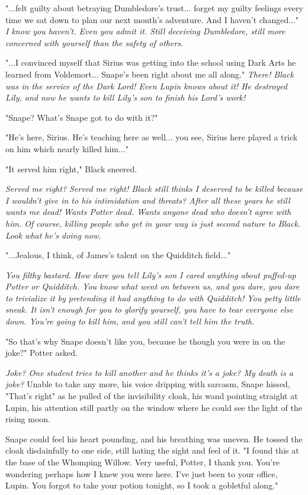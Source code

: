 \documentclass[a4paper,11pt]{article}
\begin{document}
"...felt guilty about betraying Dumbledore's trust... forget my guilty feelings every time we sat down to plan our next month's adventure. And I haven't changed..." \emph{I know you haven't. Even you admit it. Still deceiving Dumbledore, still more concerned with yourself than the safety of others.}

"...I convinced myself that Sirius was getting into the school using Dark Arts he learned from Voldemort... Snape's been right about me all along." \emph{There! Black was in the service of the Dark Lord! Even Lupin knows about it! He destroyed Lily, and now he wants to kill Lily's son to finish his Lord's work!}

"Snape? What's Snape got to do with it?"

"He's here, Sirius. He's teaching here as well... you see, Sirius here played a trick on him which nearly killed him..."

"It served him right," Black sneered.

\emph{Served me right? Served me right! Black still thinks I deserved to be killed because I wouldn't give in to his intimidation and threats? After all these years he still wants me dead! Wants Potter dead. Wants anyone dead who doesn't agree with him. Of course, killing people who get in your way is just second nature to Black. Look what he's doing now.}

"...Jealous, I think, of James's talent on the Quidditch field..."

\emph{You filthy bastard. How dare you tell Lily's son I cared anything about puffed-up Potter or Quidditch. You know what went on between us, and you dare, you dare to trivialize it by pretending it had anything to do with Quidditch! You petty little sneak. It isn't enough for you to glorify yourself, you have to tear everyone else down. You're going to kill him, and you still can't tell him the truth.}

"So that's why Snape doesn't like you, because he though you were in on the joke?" Potter asked.

\emph{Joke? One student tries to kill another and he thinks it's a joke? My death is a joke?} Unable to take any more, his voice dripping with sarcasm, Snape hissed, "That's right" as he pulled of the invisibility cloak, his wand pointing straight at Lupin, his attention still partly on the window where he could see the light of the rising moon.

Snape could feel his heart pounding, and his breathing was uneven. He tossed the cloak disdainfully to one side, still hating the sight and feel of it. "I found this at the base of the Whomping Willow. Very useful, Potter, I thank you. You're wondering perhaps how I knew you were here. I've just been to your office, Lupin. You forgot to take your potion tonight, so I took a gobletful along."
\end{document}
